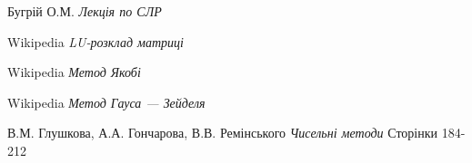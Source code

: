\documentclass[12pt,a4paper]{article}
\begin{document}
\begin{thebibliography}{99}
Бугрій О.М.
\emph{Лекція по СЛР}

Wikipedia
\emph{LU-розклад матриці}

Wikipedia
\emph{Метод Якобі}

Wikipedia
\emph{Метод Гауса — Зейделя}

В.М. Глушкова, А.А. Гончарова, В.В. Ремінського
\emph{Чисельні методи}
Сторінки 184-212
\end{thebibliography}
\end{document}
